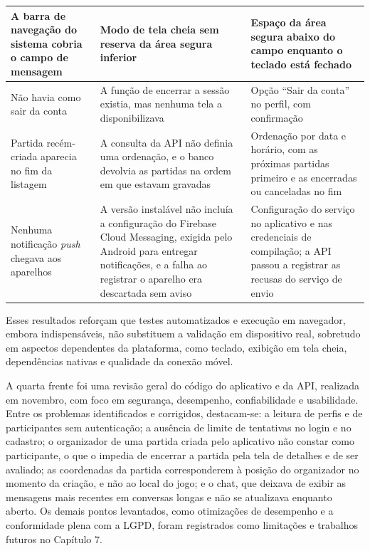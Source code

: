\documentclass[a4paper, 12pt]{article}
\begin{document}
\begin{justify}
\begin{table}[H]
\begin{tabular}{|p{4.6cm}|p{4.7cm}|p{4.7cm}|}
\hline
A barra de navegação do sistema cobria o campo de mensagem & Modo de tela cheia sem reserva da área segura inferior & Espaço da área segura abaixo do campo enquanto o teclado está fechado \\
\hline
Não havia como sair da conta & A função de encerrar a sessão existia, mas nenhuma tela a disponibilizava & Opção ``Sair da conta'' no perfil, com confirmação \\
\hline
Partida recém-criada aparecia no fim da listagem & A consulta da API não definia uma ordenação, e o banco devolvia as partidas na ordem em que estavam gravadas & Ordenação por data e horário, com as próximas partidas primeiro e as encerradas ou canceladas no fim \\
\hline
Nenhuma notificação \textit{push} chegava aos aparelhos & A versão instalável não incluía a configuração do Firebase Cloud Messaging, exigida pelo Android para entregar notificações, e a falha ao registrar o aparelho era descartada sem aviso & Configuração do serviço no aplicativo e nas credenciais de compilação; a API passou a registrar as recusas do serviço de envio \\
\hline
\end{tabular}
\end{table}

Esses resultados reforçam que testes automatizados e execução em navegador, embora indispensáveis, não substituem a validação em dispositivo real, sobretudo em aspectos dependentes da plataforma, como teclado, exibição em tela cheia, dependências nativas e qualidade da conexão móvel.

A quarta frente foi uma revisão geral do código do aplicativo e da API, realizada em novembro, com foco em segurança, desempenho, confiabilidade e usabilidade. Entre os problemas identificados e corrigidos, destacam-se: a leitura de perfis e de participantes sem autenticação; a ausência de limite de tentativas no login e no cadastro; o organizador de uma partida criada pelo aplicativo não constar como participante, o que o impedia de encerrar a partida pela tela de detalhes e de ser avaliado; as coordenadas da partida corresponderem à posição do organizador no momento da criação, e não ao local do jogo; e o chat, que deixava de exibir as mensagens mais recentes em conversas longas e não se atualizava enquanto aberto. Os demais pontos levantados, como otimizações de desempenho e a conformidade plena com a LGPD, foram registrados como limitações e trabalhos futuros no Capítulo 7.


\end{justify}
\end{document}
